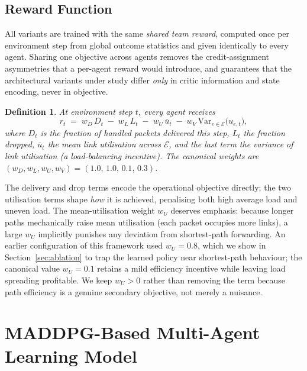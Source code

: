 \documentclass[10pt,journal,comsoc]{IEEEtran}
\newtheorem{definition}{Definition}
\begin{document}
\subsection{Reward Function}
All variants are trained with the same \emph{shared team reward}, computed once per environment step from global outcome statistics and given identically to every agent. Sharing one objective across agents removes the credit-assignment asymmetries that a per-agent reward would introduce, and guarantees that the architectural variants under study differ \emph{only} in critic information and state encoding, never in objective.

\begin{definition}
  \label{def:reward_function}
  At environment step $t$, every agent receives
  \begin{equation}
    r_t \;=\; w_D\, D_t \;-\; w_L\, L_t \;-\; w_U\, \bar{u}_t \;-\; w_V\, \mathrm{Var}_{e\in\mathcal{E}}\big(u_{e,t}\big),
    \label{eq:reward_function}
  \end{equation}
  where $D_t$ is the fraction of handled packets delivered this step, $L_t$ the fraction dropped, $\bar{u}_t$ the mean link utilisation across $\mathcal{E}$, and the last term the variance of link utilisation (a load-balancing incentive). The canonical weights are $(w_D, w_L, w_U, w_V) = (1.0,\, 1.0,\, 0.1,\, 0.3)$.
\end{definition}

The delivery and drop terms encode the operational objective directly; the two utilisation terms shape \emph{how} it is achieved, penalising both high average load and uneven load. The mean-utilisation weight $w_U$ deserves emphasis: because longer paths mechanically raise mean utilisation (each packet occupies more links), a large $w_U$ implicitly punishes any deviation from shortest-path forwarding. An earlier configuration of this framework used $w_U = 0.8$, which we show in Section~\ref{sec:ablation} to trap the learned policy near shortest-path behaviour; the canonical value $w_U = 0.1$ retains a mild efficiency incentive while leaving load spreading profitable. We keep $w_U > 0$ rather than removing the term because path efficiency is a genuine secondary objective, not merely a nuisance.

\section{MADDPG-Based Multi-Agent Learning Model}
\label{sec:maddpg}
\end{document}
